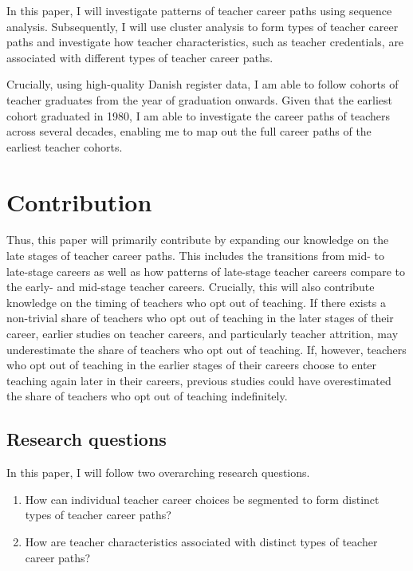\documentclass[
]{article}
\begin{document}
In this paper, I will investigate patterns of teacher career paths using sequence analysis. Subsequently, I will use cluster analysis to form types of teacher career paths and investigate how teacher characteristics, such as teacher credentials, are associated with different types of teacher career paths.

Crucially, using high-quality Danish register data, I am able to follow cohorts of teacher graduates from the year of graduation onwards. Given that the earliest cohort graduated in 1980, I am able to investigate the career paths of teachers across several decades, enabling me to map out the full career paths of the earliest teacher cohorts.

\hypertarget{contribution}{%
\section{Contribution}\label{contribution}}

Thus, this paper will primarily contribute by expanding our knowledge on the late stages of teacher career paths. This includes the transitions from mid- to late-stage careers as well as how patterns of late-stage teacher careers compare to the early- and mid-stage teacher careers. Crucially, this will also contribute knowledge on the timing of teachers who opt out of teaching. If there exists a non-trivial share of teachers who opt out of teaching in the later stages of their career, earlier studies on teacher careers, and particularly teacher attrition, may underestimate the share of teachers who opt out of teaching. If, however, teachers who opt out of teaching in the earlier stages of their careers choose to enter teaching again later in their careers, previous studies could have overestimated the share of teachers who opt out of teaching indefinitely.

\hypertarget{research-questions}{%
\subsection{Research questions}\label{research-questions}}

In this paper, I will follow two overarching research questions.

\begin{enumerate}
\def\labelenumi{\arabic{enumi})}
\item
  How can individual teacher career choices be segmented to form distinct types of teacher career paths?
\item
  How are teacher characteristics associated with distinct types of teacher career paths?
\end{enumerate}
\end{document}
